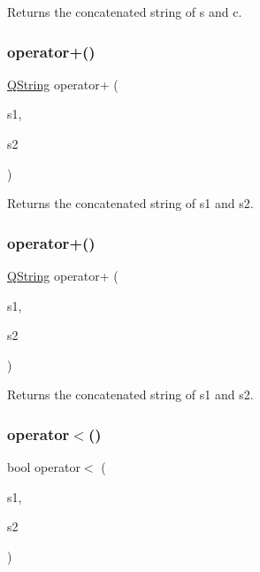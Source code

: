 Returns the concatenated string of s and c. \mbox{\label{class_q_string_aeebc8da866e999cf9d98f409149a7274}} 
\subsubsection{\texorpdfstring{operator+()}{operator+()}\hspace{0.1cm}{\footnotesize\ttfamily [4/5]}}
{\footnotesize\ttfamily \mbox{\hyperlink{class_q_string}{Q\+String}} operator+ (\begin{DoxyParamCaption}\item[{const \mbox{\hyperlink{class_q_string}{Q\+String}} \&}]{s1,  }\item[{const char $\ast$}]{s2 }\end{DoxyParamCaption})\hspace{0.3cm}{\ttfamily [related]}}

Returns the concatenated string of s1 and s2. \mbox{\label{class_q_string_ae485733155e818a24470bab6b39007a3}} 
\subsubsection{\texorpdfstring{operator+()}{operator+()}\hspace{0.1cm}{\footnotesize\ttfamily [5/5]}}
{\footnotesize\ttfamily \mbox{\hyperlink{class_q_string}{Q\+String}} operator+ (\begin{DoxyParamCaption}\item[{const \mbox{\hyperlink{class_q_string}{Q\+String}} \&}]{s1,  }\item[{const \mbox{\hyperlink{class_q_string}{Q\+String}} \&}]{s2 }\end{DoxyParamCaption})\hspace{0.3cm}{\ttfamily [related]}}

Returns the concatenated string of s1 and s2. \mbox{\label{class_q_string_ad25d50b4f92864191c30a5a76e7894b8}} 
\subsubsection{\texorpdfstring{operator$<$()}{operator<()}\hspace{0.1cm}{\footnotesize\ttfamily [1/2]}}
{\footnotesize\ttfamily bool operator$<$ (\begin{DoxyParamCaption}\item[{const char $\ast$}]{s1,  }\item[{const \mbox{\hyperlink{class_q_string}{Q\+String}} \&}]{s2 }\end{DoxyParamCaption})\hspace{0.3cm}{\ttfamily [related]}}

